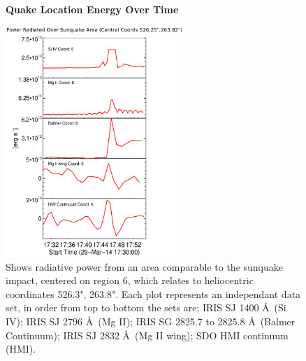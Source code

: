 \begin{figure}[H]
  \begin{center}
  \textbf{Quake Location Energy Over Time}\par\medskip
  \includegraphics[width=0.6\textwidth]{29-Mar-14-Ribbon-Area-6-Sunquake-Area-Power-Ladder}
  \end{center}
  \caption{Shows radiative power from an area comparable to the sunquake impact, centered on region 6, which relates to heliocentric coordinates 526.3", 263.8". Each plot represents an independant data set, in order from top to bottom the sets are; IRIS SJ 1400 \AA\ (Si IV); IRIS SJ 2796 \AA\ (Mg II); IRIS SG  2825.7 to 2825.8 \AA\ (Balmer Continuum); IRIS SJ 2832 \AA\ (Mg II wing); SDO HMI continuum (HMI).}\label{plot6}
\end{figure}
